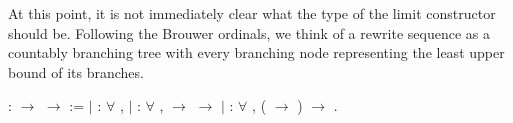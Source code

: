 At this point, it is not immediately clear what the type of the limit
constructor should be. Following the Brouwer ordinals, we think of a rewrite
sequence as a countably branching tree with every branching node representing
the least upper bound of its branches.
\begin{singlespace}
\begin{coqdoccode}
\coqdocnoindent
{}
 :
 \ensuremath{\rightarrow}
 \ensuremath{\rightarrow}
 :=\coqdoceol
\coqdocindent{1.00em}
\ensuremath{|}  :
\ensuremath{\forall} , 
\coqdoceol \coqdocindent{1.00em}
\ensuremath{|}  :
\ensuremath{\forall}   , 
 
$\rightarrow$
 
 $\rightarrow$ 
\coqdoceol \coqdocindent{1.00em}
\ensuremath{|}    :
\ensuremath{\forall}  ,
(
\ensuremath{\rightarrow} 
) $\rightarrow$
.\coqdoceol
\end{coqdoccode}
\end{singlespace}

